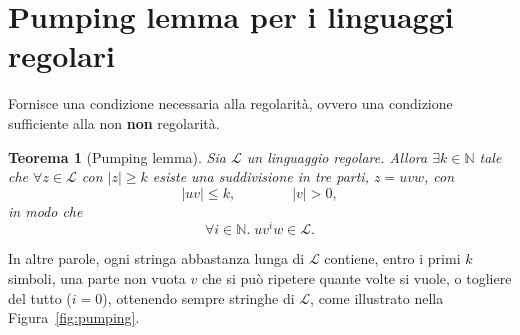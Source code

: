 \documentclass[a4paper, 11pt, oneside]{book}
\theoremstyle{formale}
\newtheorem{theorem}{Teorema}
\begin{document}
    \section{Pumping lemma per i linguaggi regolari}
    \label{sec:pumping}
    Fornisce una condizione necessaria alla regolarit\`a, ovvero una condizione sufficiente
    alla non \textbf{non} regolarit\`a.
    \begin{theorem}[Pumping lemma]
        \label{thm:pumping}
        Sia $\mathcal{L}$ un linguaggio regolare. Allora  $\exists k \in \mathbb{N}$ tale
        che $\forall z \in \mathcal{L}$ con $|z| \geq k$ esiste una suddivisione in tre
        parti, $z = uvw$, con
        \begin{equation*}
            |uv| \leq k,
            \qquad\qquad
            |v| > 0,
        \end{equation*}
        in modo che
        \begin{equation*}
            \forall i \in \mathbb{N}.\; uv^i w \in \mathcal{L}.
        \end{equation*}
    \end{theorem}
    In altre parole, ogni stringa abbastanza lunga di $\mathcal{L}$ contiene, entro i
    primi $k$ simboli, una parte non vuota $v$ che si pu\`o ripetere quante volte si
    vuole, o togliere del tutto ($i = 0$), ottenendo sempre stringhe di $\mathcal{L}$,
    come illustrato nella Figura~\ref{fig:pumping}.
\end{document}
